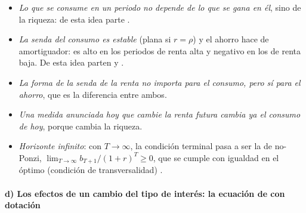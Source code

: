\documentclass[11pt]{article}
\begin{document}
\begin{itemize}
\item \emph{Lo que se consume en un periodo no depende de lo que se gana en él}, sino de la riqueza: de esta idea parte .
\item \emph{La senda del consumo es estable} (plana si $r=\rho$) y el ahorro hace de amortiguador: es alto en los periodos de renta alta y negativo en los de renta baja. De esta idea parten  y .
\item \emph{La forma de la senda de la renta no importa para el consumo, pero sí para el ahorro}, que es la diferencia entre ambos.
\item \emph{Una medida anunciada hoy que cambie la renta futura cambia ya el consumo de hoy}, porque cambia la riqueza.
\item \emph{Horizonte infinito}: con $T\to\infty$, la condición terminal pasa a ser la de no-Ponzi, $\lim_{T\to\infty}b_{T+1}/(1+r)^T\geq 0$, que se cumple con igualdad en el óptimo (condición de transversalidad) .
\end{itemize}

\paragraph{d) Los efectos de un cambio del tipo de interés: la ecuación de  con dotación}
\end{document}
